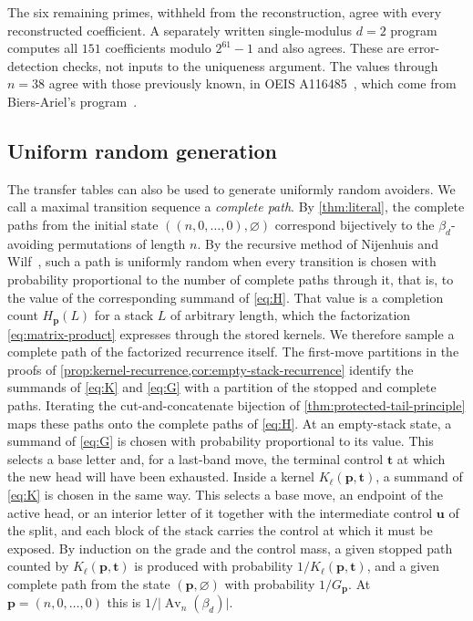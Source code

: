 \documentclass[11pt,reqno]{amsart}
\theoremstyle{definition}
\theoremstyle{remark}
\newcommand{\Av}{\operatorname{Av}}
\begin{document}
The six remaining primes, withheld from the reconstruction, agree with every
reconstructed coefficient.  A separately written single-modulus $d=2$
program computes all $151$ coefficients modulo $2^{61}-1$ and also agrees.
These are error-detection checks, not inputs to the uniqueness argument.
The values through $n=38$ agree with those previously known, in OEIS
A116485~\cite{OEISA116485}, which come from Biers-Ariel's
program~\cite{BiersArielA116485}.

\subsection{Uniform random generation}\label{sec:sampling}

The transfer tables can also be used to generate uniformly random avoiders.  We
call a maximal transition sequence a \emph{complete path}.  By
\cref{thm:literal}, the complete paths from the initial state
$((n,0,\ldots,0),\varnothing)$ correspond bijectively to the
$\beta_d$-avoiding permutations of length $n$.  By the recursive method of
Nijenhuis and Wilf~\cite{NijenhuisWilf1978}, such a path is uniformly random
when every transition is chosen with probability proportional to the number
of complete paths through it, that is, to the value of the
corresponding summand of \eqref{eq:H}.  That value is a completion count
$H_{\mathbf p}(L)$ for a stack $L$ of arbitrary length, which the
factorization \eqref{eq:matrix-product} expresses through the stored
kernels.  We therefore sample a complete path of the factorized recurrence
itself.  The first-move partitions in the proofs of
\cref{prop:kernel-recurrence,cor:empty-stack-recurrence} identify the
summands of \eqref{eq:K} and \eqref{eq:G} with a partition of the stopped
and complete paths.  Iterating the cut-and-concatenate bijection of
\cref{thm:protected-tail-principle} maps these paths onto the complete
paths of \eqref{eq:H}.  At an empty-stack state, a summand of \eqref{eq:G}
is chosen with probability proportional to its value.  This selects a base
letter and, for a last-band move, the terminal control $\mathbf t$ at which
the new head will have been exhausted.  Inside a kernel
$K_\ell(\mathbf p,\mathbf t)$, a summand of \eqref{eq:K} is chosen in the
same way.  This selects a base move, an endpoint of the active head, or an
interior letter of it together with the intermediate control $\mathbf u$ of
the split, and each block of the stack carries the control at which it must be
exposed.  By induction on the grade and the control mass, a given stopped path
counted by $K_\ell(\mathbf p,\mathbf t)$ is produced with probability
$1/K_\ell(\mathbf p,\mathbf t)$, and a given complete path from the state
$(\mathbf p,\varnothing)$ with probability $1/G_{\mathbf p}$.  At
$\mathbf p=(n,0,\ldots,0)$ this is $1/\lvert\Av_n(\beta_d)\rvert$.
\end{document}
